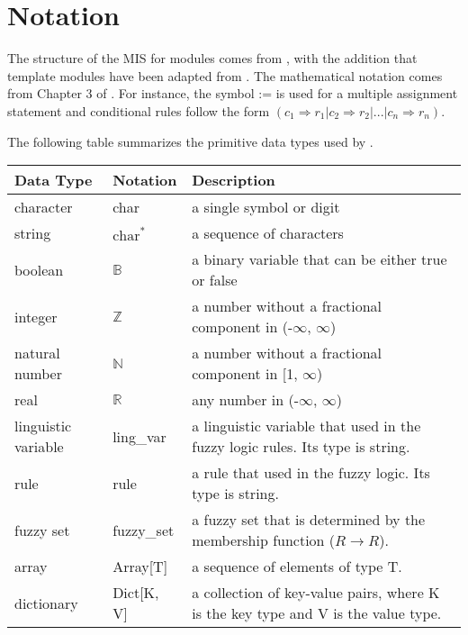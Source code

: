 \documentclass[12pt, titlepage]{article}
\begin{document}
\section{Notation}


The structure of the MIS for modules comes from \citet{HoffmanAndStrooper1995},
with the addition that template modules have been adapted from
\cite{GhezziEtAl2003}.  The mathematical notation comes from Chapter 3 of
\citet{HoffmanAndStrooper1995}.  For instance, the symbol := is used for a
multiple assignment statement and conditional rules follow the form $(c_1
\Rightarrow r_1 | c_2 \Rightarrow r_2 | ... | c_n \Rightarrow r_n )$.

The following table summarizes the primitive data types used by \progname. 

\begin{center}
\renewcommand{\arraystretch}{1.2}
\noindent 
\begin{tabular}{l l p{7.5cm}} 
\toprule 
\textbf{Data Type} & \textbf{Notation} & \textbf{Description}\\ 
\midrule
character & char & a single symbol or digit\\
string & $\text{char}^*$ & a sequence of characters\\
boolean & $\mathbb{B}$ & a binary variable that can be either true or false\\
integer & $\mathbb{Z}$ & a number without a fractional component in (-$\infty$, $\infty$) \\
natural number & $\mathbb{N}$ & a number without a fractional component in [1, $\infty$) \\
real & $\mathbb{R}$ & any number in (-$\infty$, $\infty$)\\
linguistic variable & ling\_var & a linguistic variable that used in the fuzzy logic rules. 
                               Its type is string.\\
rule & rule & a rule that used in the fuzzy logic. Its type is string.\\
fuzzy set & fuzzy\_set & a fuzzy set that is determined by the membership function ($R \rightarrow R$).\\
array & Array[T] & a sequence of elements of type T.\\
dictionary & Dict[K, V] & a collection of key-value pairs, where K is the key type and V is the value type.\\
\bottomrule
\end{tabular} 
\end{center}
\end{document}
